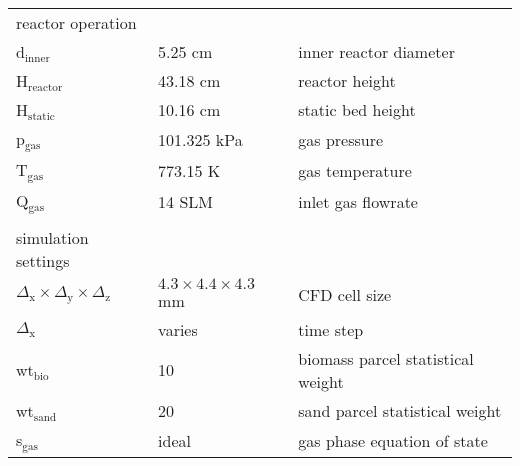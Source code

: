 \begin{table}[H]
\begin{tabular}{lll}
        \\
        reactor operation \\
        d$_\text{inner}$      & 5.25 cm       & inner reactor diameter \\
        H$_\text{reactor}$    & 43.18 cm      & reactor height \\
        H$_\text{static}$     & 10.16 cm      & static bed height \\
        p$_\text{gas}$        & 101.325 kPa   & gas pressure \\
        T$_\text{gas}$        & 773.15 K      & gas temperature \\
        Q$_\text{gas}$        & 14 SLM        & inlet gas flowrate \\
        \\
        simulation settings \\
        $\Delta_\text{x} \times \Delta_\text{y} \times \Delta_\text{z}$ & $4.3 \times 4.4 \times 4.3$ mm & CFD cell size \\
        $\Delta_\text{x}$   & varies & time step \\
        wt$_\text{bio}$      & 10     & biomass parcel statistical weight \\
        wt$_\text{sand}$     & 20     & sand parcel statistical weight \\
        s$_\text{gas}$               & ideal  & gas phase equation of state \\
        \bottomrule
    \end{tabular}
\end{table}





